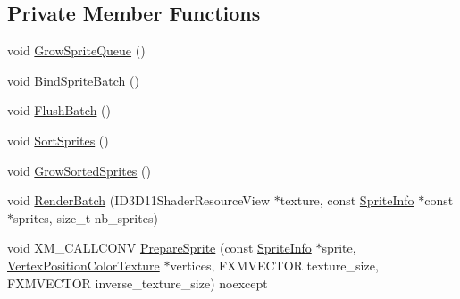 \subsection*{Private Member Functions}
\begin{DoxyCompactItemize}
\item 
void \hyperlink{classmage_1_1_sprite_batch_a7e12144793e4a69c2f9eb7aea9326049}{Grow\+Sprite\+Queue} ()
\item 
void \hyperlink{classmage_1_1_sprite_batch_ae37c48045926d4758b6c701c06be64de}{Bind\+Sprite\+Batch} ()
\item 
void \hyperlink{classmage_1_1_sprite_batch_a352714b5d02590245ab8ffe8489305f7}{Flush\+Batch} ()
\item 
void \hyperlink{classmage_1_1_sprite_batch_af7a5d406b02cd477c9b80eae9984aa86}{Sort\+Sprites} ()
\item 
void \hyperlink{classmage_1_1_sprite_batch_ae403aa1afdd7df1f67bfd98ced8e76a4}{Grow\+Sorted\+Sprites} ()
\item 
void \hyperlink{classmage_1_1_sprite_batch_a37356dc0119bcc4237ca9d05a40628e7}{Render\+Batch} (I\+D3\+D11\+Shader\+Resource\+View $\ast$texture, const \hyperlink{structmage_1_1_sprite_info}{Sprite\+Info} $\ast$const $\ast$sprites, size\+\_\+t nb\+\_\+sprites)
\item 
void X\+M\+\_\+\+C\+A\+L\+L\+C\+O\+NV \hyperlink{classmage_1_1_sprite_batch_ade27cb47058823566f360356c1e245ec}{Prepare\+Sprite} (const \hyperlink{structmage_1_1_sprite_info}{Sprite\+Info} $\ast$sprite, \hyperlink{structmage_1_1_vertex_position_color_texture}{Vertex\+Position\+Color\+Texture} $\ast$vertices, F\+X\+M\+V\+E\+C\+T\+OR texture\+\_\+size, F\+X\+M\+V\+E\+C\+T\+OR inverse\+\_\+texture\+\_\+size) noexcept
\end{DoxyCompactItemize}
